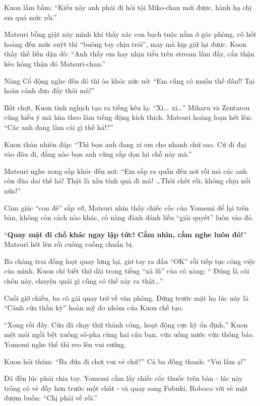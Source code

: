 \documentclass[../main.tex]{subfiles}
\begin{document}
Kuon lầm bầm: ``Kiểu này anh phải đi hỏi tội Miko-chan mới được, hành hạ chị em quá mức rồi.''


Matsuri bỗng giật nảy mình khi thấy xác con bạch tuộc nằm ở góc phòng, cô hốt hoảng đến mức suýt thì ``buông tay chịu trói'', may mà kịp giữ lại được. Kuon thấy thế liền dặn dò: ``Anh thấy em hay nhịn tiểu trên stream lắm đấy, cẩn thận kẻo hỏng thận đó Matsuri-chan.''

Nàng Cổ động nghe đến đó thì òa khóc nức nở: ``Em cũng có muốn thế đâu!! Tại hoàn cảnh đưa đẩy thôi mà!''

Bất chợt, Kuon tinh nghịch tạo ra tiếng kêu lạ: ``Xi\dots\ xi\dots'' Miharu và Zentarou cũng hiểu ý mà hùa theo làm tiếng động kích thích. Matsuri hoảng loạn hét lên: ``Các anh đang làm cái gì thế hả!?''

Kuon thản nhiên đáp: ``Thì bọn anh đang xi em cho nhanh chứ sao. Cứ đi đại vào đâu đi, đằng nào bọn anh cũng sắp dọn lại chỗ này mà.''

Matsuri nghe xong sắp khóc đến nơi: ``Em sắp ra quần đến nơi rồi mà các anh còn đùa dai thế hả! Thật là xấu tính quá đi mà! \dots Thôi chết rồi, không chịu nổi nữa!''


Cảm giác ``con đê'' sắp vỡ, Matsuri nhìn thấy chiếc cốc của Yomemi để lại trên bàn, không còn cách nào khác, cô nàng đành đánh liều ``giải quyết'' luôn vào đó.

``\textbf{Quay mặt đi chỗ khác ngay lập tức! Cấm nhìn, cấm nghe luôn đó!}'' Matsuri hét lên rồi cuống cuồng chuẩn bị.

Ba chàng trai đồng loạt quay lưng lại, giơ tay ra dấu ``OK'' rồi tiếp tục công việc của mình. Kuon chỉ biết thở dài trong tiếng ``xả lũ'' của cô nàng: ``{\color{red} Đúng là cái chốn này, chuyện quái gì cũng có thể xảy ra thật\dots}''

\ct

Cuối giờ chiều, ba cô gái quay trở về văn phòng. Đứng trước mặt họ lúc này là ``Cánh cửa thần kỳ'' hoàn mỹ do nhóm của Kuon chế tạo.

``Xong rồi đây. Cửa đã chạy thử thành công, hoạt động cực kỳ ổn định,'' Kuon mệt mỏi ngồi bệt xuống sô-pha cùng hai cậu bạn, vừa uống nước vừa thông báo. Yomemi nghe thế thì reo lên vui sướng.

Kuon hỏi thăm: ``Ba đứa đi chơi vui vẻ chứ?''
Cả ba đồng thanh: ``Vui lắm ạ!''

Đã đến lúc phải chia tay. Yomemi cầm lấy chiếc cốc thuốc trên bàn - lúc này trông có vẻ đầy hơn trước một chút - và quay sang Fubuki, Roboco với vẻ mặt đượm buồn: ``Chị phải về rồi.''
\end{document}
